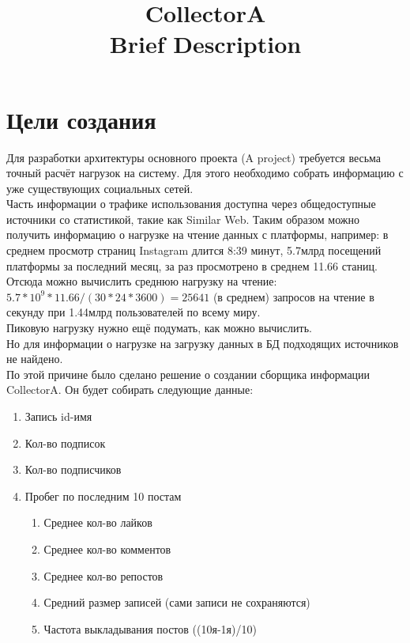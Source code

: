 \documentclass[12pt]{article}
\title{CollectorA \\ Brief Description}
\begin{document}
\maketitle

\section*{Цели создания}
Для разработки архитектуры основного проекта (A project) требуется весьма точный расчёт нагрузок на систему. 
Для этого необходимо собрать информацию с уже существующих социальных сетей. \\

Часть информации о трафике использования доступна через общедоступные источники со статистикой, такие как Similar Web. 
Таким образом можно получить информацию о нагрузке на чтение данных с платформы, например: в среднем просмотр страниц Instagram длится 8:39 минут, 
5.7млрд посещений платформы за последний месяц, за раз просмотрено в среднем 11.66 станиц. Отсюда можно вычислить среднюю нагрузку на чтение: 
$5.7 * 10^9 * 11.66 / (30 * 24 * 3600) = 25641$ (в среднем) запросов на чтение в секунду при 1.44млрд пользователей по всему миру.\\

Пиковую нагрузку нужно ещё подумать, как можно вычислить.\\

Но для информации о нагрузке на загрузку данных в БД подходящих источников не найдено.\\

По этой причине было сделано решение о создании сборщика информации CollectorA. Он будет собирать следующие данные:
\begin{enumerate}
    \item Запись id-имя
    \item Кол-во подписок
    \item Кол-во подписчиков
    \item Пробег по последним 10 постам
        \begin {enumerate}
            \item Среднее кол-во лайков
            \item Среднее кол-во комментов
            \item Среднее кол-во репостов
            \item Средний размер записей (сами записи не сохраняются)
            \item Частота выкладывания постов ((10я-1я)/10)
        \end{enumerate}
\end{enumerate}
\end{document}
